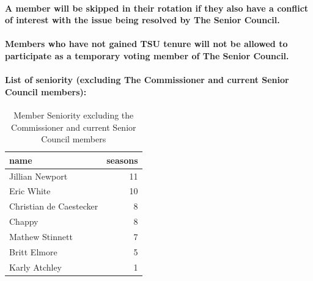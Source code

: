 \documentclass[
]{book}
\begin{document}
\hypertarget{a-member-will-be-skipped-in-their-rotation-if-they-also-have-a-conflict-of-interest-with-the-issue-being-resolved-by-the-senior-council.}{%
\paragraph{A member will be skipped in their rotation if they also have a conflict of interest with the issue being resolved by The Senior Council.}\label{a-member-will-be-skipped-in-their-rotation-if-they-also-have-a-conflict-of-interest-with-the-issue-being-resolved-by-the-senior-council.}}

\hypertarget{members-who-have-not-gained-tsu-tenure-will-not-be-allowed-to-participate-as-a-temporary-voting-member-of-the-senior-council.}{%
\paragraph{Members who have not gained TSU tenure will not be allowed to participate as a temporary voting member of The Senior Council.}\label{members-who-have-not-gained-tsu-tenure-will-not-be-allowed-to-participate-as-a-temporary-voting-member-of-the-senior-council.}}

\hypertarget{list-of-seniority-excluding-the-commissioner-and-current-senior-council-members}{%
\paragraph{List of seniority (excluding The Commissioner and current Senior Council members):}\label{list-of-seniority-excluding-the-commissioner-and-current-senior-council-members}}

\begin{table}

\caption{\label{tab:unnamed-chunk-4}Member Seniority excluding the Commissioner and current Senior Council members}
\centering
\begin{tabular}[t]{lr}
\toprule
name & seasons\\
\midrule
Jillian Newport & 11\\
Eric White & 10\\
Christian de Caestecker & 8\\
Chappy & 8\\
Mathew Stinnett & 7\\
\addlinespace
Britt Elmore & 5\\
Karly Atchley & 1\\
\bottomrule
\end{tabular}
\end{table}
\end{document}
